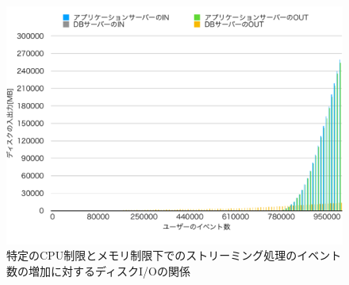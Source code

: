 \documentclass[../../../../../../main]{subfiles}
\begin{document}
    \begin{figure}[H]
        \centering
        \includegraphics[width=12cm]{graph}
        \caption{特定のCPU制限とメモリ制限下でのストリーミング処理のイベント数の増加に対するディスクI/Oの関係}
        \label{fig:stream-disio-app_1_1024-db_1_1024}
    \end{figure}
\end{document}
